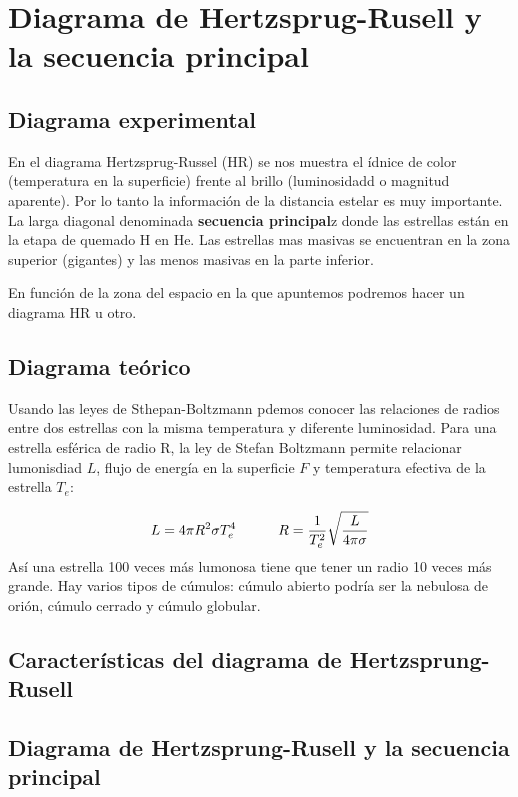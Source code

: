 \section{Diagrama de Hertzsprug-Rusell y la secuencia principal}

\subsection{Diagrama experimental}

En el diagrama Hertzsprug-Russel (HR) se nos muestra el ídnice de color (temperatura en la superficie) frente al brillo (luminosidadd o magnitud aparente). Por lo tanto la información de la distancia estelar es muy importante. La larga diagonal denominada \textbf{secuencia principal}z donde las estrellas están en la etapa de quemado H en He. Las estrellas mas masivas se encuentran en la zona superior (gigantes) y las menos masivas en la parte inferior. 

En función de la zona del espacio en la que apuntemos podremos hacer un diagrama HR u otro. 

\subsection{Diagrama teórico}


Usando las leyes de Sthepan-Boltzmann pdemos conocer las relaciones de radios entre dos estrellas con la misma temperatura y diferente luminosidad. Para una estrella esférica de radio R, la ley de Stefan Boltzmann permite relacionar lumonisdiad $L$, flujo de energía en la superficie $F$ y temperatura efectiva de la estrella $T_e$:

\begin{equation}
    L = 4\pi R^2 \sigma T_e^4 \quad \quad \quad R = \frac{1}{T_e^2} \sqrt{\frac{L}{4\pi \sigma}}
\end{equation}
Así una estrella 100 veces más lumonosa tiene que tener un radio 10 veces más grande. Hay  varios tipos de cúmulos: cúmulo abierto podría ser la nebulosa de orión, cúmulo cerrado y cúmulo globular.

\subsection{Características del diagrama de Hertzsprung-Rusell}



\subsection{Diagrama de Hertzsprung-Rusell y la secuencia principal}

